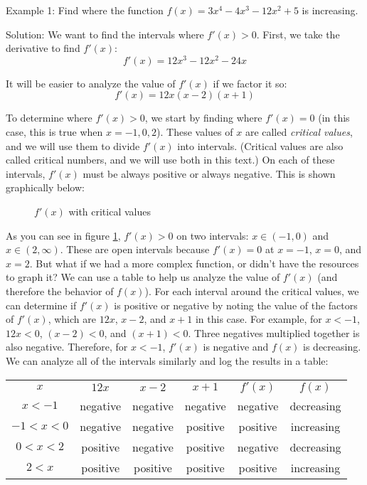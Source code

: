 Example 1: Find where the function $f(x) = 3x^4-4x^3-12x^2+5$ is increasing. 

Solution: We want to find the intervals where $f'(x)>0$. First, we take the 
derivative to find $f'(x)$:
$$f'(x) = 12x^3-12x^2-24x$$

It will be easier to analyze the value of $f'(x)$ if we factor it so:
$$f'(x) = 12x(x-2)(x+1)$$

To determine where $f'(x)>0$, we start by finding where $f'(x)=0$ (in this 
case, this is true when $x=-1, 0, 2$). These values of $x$ are called \textit{
critical values}, and we will use them to divide $f'(x)$ into intervals. 
(Critical values are also called critical numbers, and we will use both in 
this text.) On each of these intervals, $f'(x)$ must be always positive or 
always negative. This is shown graphically below:

\begin{figure}
	\caption{$f'(x)$ with critical values}
	\label{fig:critval1}
\end{figure}


As you can see in figure \ref{fig:critval1}, $f'(x)>0$ on two intervals: $x 
\in (-1, 0) $ and $x \in (2, \infty)$. These are open intervals because $f'(x) 
= 0$ at $x = -1$, $x = 0$, and $x = 2$. But what if we had a more complex 
function, or didn't have the resources to graph it? We can use a table to help 
us analyze the value of $f'(x)$ (and therefore the behavior of $f(x)$). For 
each interval around the critical values, we can determine if $f'(x)$ is 
positive or negative by noting the value of the factors of $f'(x)$, which are 
$12x$, $x-2$, and $x+1$ in this case. For example, for $x < -1$, $12x < 0$, $(
x - 2) < 0$, and $(x + 1) < 0$. Three negatives multiplied together is also 
negative. Therefore, for $x<-1$, $f'(x)$ is negative and $f(x)$ is decreasing. 
We can analyze all of the intervals similarly and log the results in a table:

\begin{tabular}{c | c | c |c|c|c}
\hline
$x$ & $12x$ & $x-2$ & $x+1$ & $f'(x)$ & $f(x)$ \\
$x<-1$ & negative & negative & negative & negative &decreasing\\
$-1<x<0$ & negative & negative & positive & positive & increasing \\
$0<x<2$ & positive & negative & positive & negative & decreasing \\
$2<x$ & positive & positive & positive & positive & increasing\\
\end{tabular}

